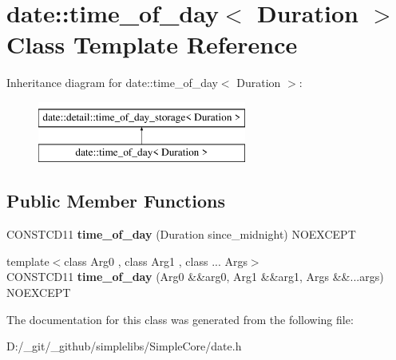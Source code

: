 \hypertarget{classdate_1_1time__of__day}{}\section{date\+::time\+\_\+of\+\_\+day$<$ Duration $>$ Class Template Reference}
\label{classdate_1_1time__of__day}
Inheritance diagram for date\+::time\+\_\+of\+\_\+day$<$ Duration $>$\+:\begin{figure}[H]
\begin{center}
\leavevmode
\includegraphics[height=2.000000cm]{classdate_1_1time__of__day}
\end{center}
\end{figure}
\subsection*{Public Member Functions}
\begin{DoxyCompactItemize}
\item 
\mbox{\label{classdate_1_1time__of__day_a23fe4cfac291b4ef6175c300fdef6524}} 
C\+O\+N\+S\+T\+C\+D11 {\bfseries time\+\_\+of\+\_\+day} (Duration since\+\_\+midnight) N\+O\+E\+X\+C\+E\+PT
\item 
\mbox{\label{classdate_1_1time__of__day_af227988df4d8dac355a7d9cb5eb6b97f}} 
{\footnotesize template$<$class Arg0 , class Arg1 , class ... Args$>$ }\\C\+O\+N\+S\+T\+C\+D11 {\bfseries time\+\_\+of\+\_\+day} (Arg0 \&\&arg0, Arg1 \&\&arg1, Args \&\&...args) N\+O\+E\+X\+C\+E\+PT
\end{DoxyCompactItemize}


The documentation for this class was generated from the following file\+:\begin{DoxyCompactItemize}
\item 
D\+:/\+\_\+git/\+\_\+github/simplelibs/\+Simple\+Core/date.\+h\end{DoxyCompactItemize}
